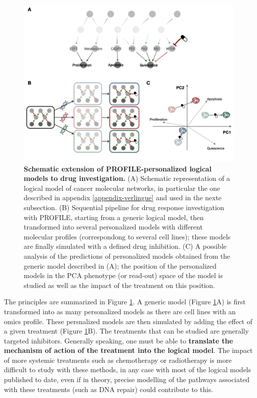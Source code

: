 \documentclass[a4paper,12pt,twoside,onecolumn,openright,final,oldfontcommands]{memoir}
\begin{document}
\begin{figure}

{\centering \includegraphics[width=0.9\linewidth]{fig/PROFILE-drug} 

}

\caption[Schematic extension of PROFILE-personalized logical models to drug investigation]{\textbf{Schematic extension of
PROFILE-personalized logical models to drug investigation.} (A)
Schematic representation of a logical model of cancer molecular
networks, in particular the one described in appendix
\ref{appendix-verlingue} and used in the nexte subsection. (B)
Sequential pipeline for drug response investigation with PROFILE,
starting from a generic logical model, then transformed into several
personalized models with different molecular profiles (correspondong to
several cell lines); these models are finally simulated with a defined
drug inhibition. (C) A possible analysis of the predictions of
personalized models obtained from the generic model described in (A);
the position of the personalized models in the PCA phenotype (or
read-out) space of the model is studied as well as the impact of the
treatment on this position.}\label{fig:PROFILE-drug}
\end{figure}
















The principles are summarized in Figure \ref{fig:PROFILE-drug}. A
generic model (Figure \ref{fig:PROFILE-drug}A) is first transformed into
as many personalized models as there are cell lines with an omics
profile. These persnalized models are then simulated by adding the
effect of a given treatment (Figure \ref{fig:PROFILE-drug}B). The
treatments that can be studied are generally targeted inhibitors.
Generally speaking, one must be able to \textbf{translate the mechanism
of action of the treatment into the logical model}. The impact of more
systemic treatments such as chemotherapy or radiotherapy is more
difficult to study with these methods, in any case with most of the
logical models published to date, even if in theory, precise modelling
of the pathways associated with these treatments (such as DNA repair)
could contribute to this.
\end{document}
